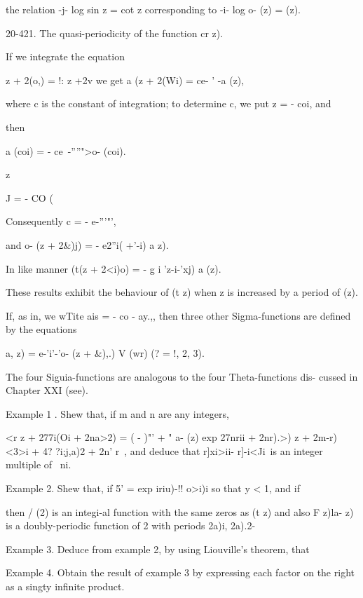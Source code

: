 {the relation -j- log sin z = cot z corresponding to -i- log o- (z) =
(z).

20-421. The quasi-periodicity of the function cr z).

If we integrate the equation

  z + 2(o,) = !: z +2v we get a (z + 2(Wi) = ce- ' -a (z),

where c is the constant of integration; to determine c, we put z = -
coi, and

then

a (coi) = - ce~-''''">o- (coi).

z

J = - CO (\

%
%

Consequently c = - e-'''"',

and o- (z + 2\&)j) = - e2''i( +'-i) a z).

In like manner (t(z + 2<i)o) = - g i 'z-i-'xj) a (z).

These results exhibit the behaviour of (t z) when z is increased by a
period of (z).

If, as in, we wTite ais = - co - ay.,, then three other
Sigma-functions are defined by the equations

a, z) = e-'i'-'o- (z + \&),.) V (wr) (? = !, 2, 3).

The four Siguia-functions are analogous to the four Theta-functions
dis- cussed in Chapter XXI (see).

Example 1 . Shew that, if m and n are any integers,

<r z + 277i(Oi + 2na>2) = ( - )"' + " a- (z) exp 27nrii + 2nr).>) z +
2m-r) <3>i + 4? ?i;j,a)2 + 2n' r\ < ia>, and deduce that r]xi>ii-
r]-i<Ji\ is an integer multiple of \ ni.

Example 2. Shew that, if 5' = exp iriu)-!! o>i)i so that y < 1, and if

then / (2) is an integi-al function with the same zeros as (t z) and
also F z)la- z) is a doubly-periodic function of 2 with periods 2a)i,
2a).2-

Example 3. Deduce from example 2, by using Liouville's theorem, that

Example 4. Obtain the result of example 3 by expressing each factor on
the right as a singty infinite product.


}
